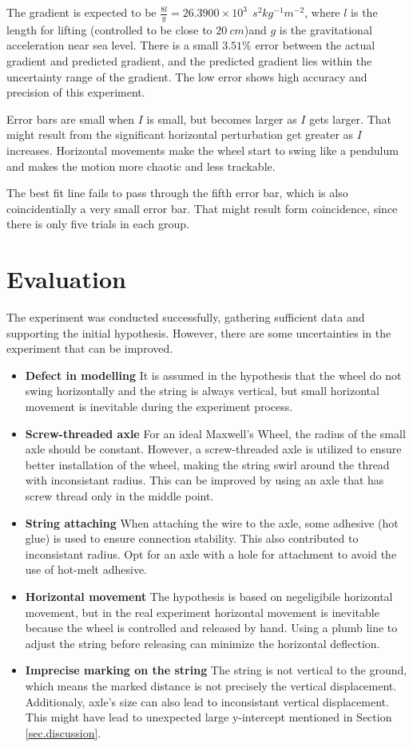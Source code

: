 \documentclass[a4paper]{article}
\begin{document}
The gradient is expected to be $\frac{8l}{g} = 26.3900 \times 10^3\ \SI{}{s^2kg^{-1}m^{-2}}$, where $l$ is the length for lifting (controlled to be close to $\SI{20}{cm}$)and $g$ is the gravitational acceleration near sea level. There is a small $3.51\%$ error between the actual gradient and predicted gradient, and the predicted gradient lies within the uncertainty range of the gradient. The low error shows high accuracy and precision of this experiment.

Error bars are small when $I$ is small, but becomes larger as $I$ gets larger. That might result from the significant horizontal perturbation get greater as $I$ increases. Horizontal movements make the wheel start to swing like a pendulum and makes the motion more chaotic and less trackable. 

The best fit line fails to pass through the fifth error bar, which is also coincidentially a very small error bar. That might result form coincidence, since there is only five trials in each group.

\section{Evaluation}
\label{sec.eval}

The experiment was conducted successfully, gathering sufficient data and supporting the initial hypothesis. However, there are some uncertainties in the experiment that can be improved. 

\begin{itemize}
    \item \textbf{Defect in modelling} It is assumed in the hypothesis that the wheel do not swing horizontally and the string is always vertical, but small horizontal movement is inevitable during the experiment process.
    \item \textbf{Screw-threaded axle} For an ideal Maxwell's Wheel, the radius of the small axle should be constant. However, a screw-threaded axle is utilized to ensure better installation of the wheel, making the string swirl around the thread with inconsistant radius. This can be improved by using an axle that has screw thread only in the middle point. 
    \item \textbf{String attaching} When attaching the wire to the axle, some adhesive (hot glue) is used to ensure connection stability. This also contributed to inconsistant radius. Opt for an axle with a hole for attachment to avoid the use of hot-melt adhesive. 
    \item \textbf{Horizontal movement} The hypothesis is based on negeligibile horizontal movement, but in the real experiment horizontal movement is inevitable because the wheel is controlled and released by hand. Using a plumb line to adjust the string before releasing can minimize the horizontal deflection.
    \item \textbf{Imprecise marking on the string} The string is not vertical to the ground, which means the marked distance is not precisely the vertical displacement. Additionaly, axle's size can also lead to inconsistant vertical displacement. This might have lead to unexpected large y-intercept mentioned in Section \ref{sec.discussion}.
\end{itemize}



\end{document}
